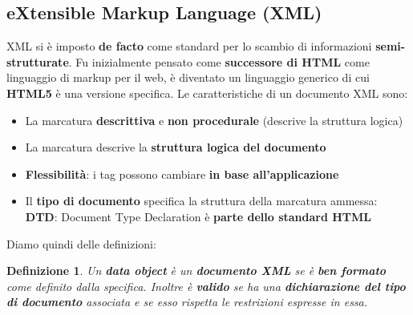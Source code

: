 \documentclass[12pt]{article}
\newtheorem{Definizione}{Definizione}[subsection]
\begin{document}
\subsection{eXtensible Markup Language (XML)}
XML si è imposto \textbf{de facto} come standard per lo scambio di informazioni \textbf{semi-strutturate}.
Fu inizialmente pensato come \textbf{successore di HTML} come linguaggio di markup per il web, è diventato un linguaggio
generico di cui \textbf{HTML5} è una versione specifica. Le caratteristiche di un documento XML sono:
\begin{itemize}
    \item La marcatura \textbf{descrittiva} e \textbf{non procedurale} (descrive la struttura logica)
    \item La marcatura descrive la \textbf{struttura logica del documento}
    \item \textbf{Flessibilità}: i tag possono cambiare \textbf{in base all'applicazione}
    \item Il \textbf{tipo di documento} specifica la struttura della marcatura ammessa: \textbf{DTD}: Document Type Declaration è \textbf{parte dello standard HTML}
\end{itemize}
Diamo quindi delle definizioni:
\begin{Definizione}
    Un \textbf{data object} è un \textbf{documento XML} se è \textbf{ben formato} come definito dalla specifica.
    Inoltre è \textbf{valido} se ha una \textbf{dichiarazione del tipo di documento} associata e se esso rispetta le restrizioni espresse in essa.
\end{Definizione}
\end{document}
